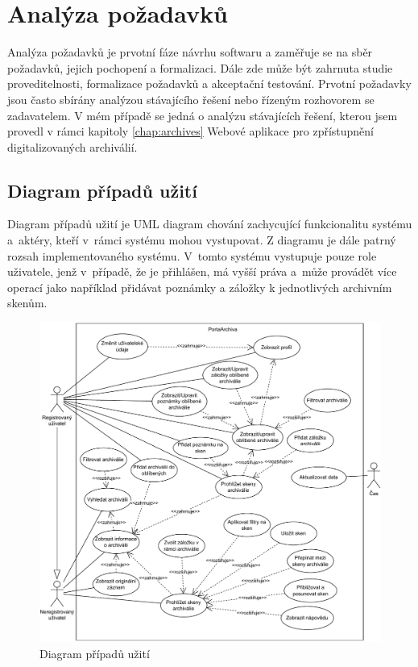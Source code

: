 \chapter{Analýza požadavků}
 \label{chap:specification}
Analýza požadavků je prvotní fáze návrhu softwaru a zaměřuje se na sběr požadavků, jejich pochopení a formalizaci. Dále zde může být zahrnuta studie proveditelnosti, formalizace požadavků a akceptační testování. Prvotní požadavky jsou často sbírány analýzou stávajícího řešení nebo řízeným rozhovorem se zadavatelem. V mém případě se jedná o analýzu stávajících řešení, kterou jsem provedl v rámci kapitoly \ref{chap:archives} Webové aplikace pro zpřístupnění digitalizovaných archiválií. 

\section{Diagram případů užití}
Diagram případů užití \cite{useCase} je UML diagram chování zachycující funkcionalitu systému a~aktéry, kteří v~rámci systému mohou vystupovat. Z diagramu je dále patrný rozsah implementovaného systému. V~tomto systému vystupuje pouze role uživatele, jenž v~případě, že je přihlášen, má vyšší práva a~může provádět více operací jako například přidávat poznámky a záložky k jednotlivých archivním skenům.
\begin{figure}[htbp]
\centering
    \includegraphics[scale=.75]{obrazky-figures/specification/useCase.pdf}
    \caption{Diagram případů užití}
\end{figure}

